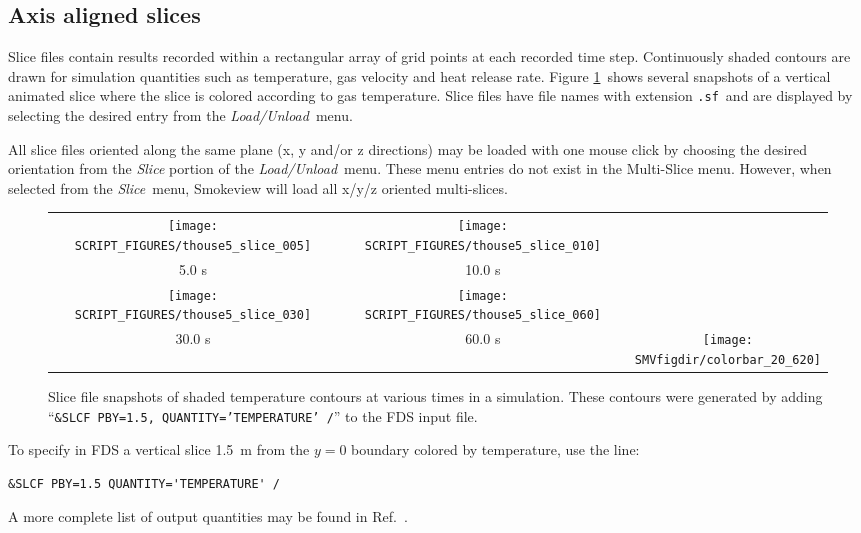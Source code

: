 \documentclass[11pt,twoside]{book}
\newcommand{\figheightAbar}{2.2in}
\begin{document}
\subsection{Axis aligned slices}

Slice files contain results recorded within a rectangular array of
grid points at each recorded time step. Continuously shaded
contours are drawn for simulation quantities such as temperature,
gas velocity and heat release rate. Figure \ref{figslice}\ shows
several snapshots of a vertical animated slice where the slice is
colored according to gas temperature. Slice files have file names
with extension {\tt .sf}\ and are displayed by selecting the
desired entry from the {\em Load/Unload}\ menu.

All slice files oriented along the same plane (x, y and/or z directions) may be loaded
with one mouse click by choosing the desired orientation from the {\em Slice}
portion of the {\em Load/Unload}\ menu.  These menu entries do not exist in the Multi-Slice menu.
However, when selected from the {\em Slice}\ menu, Smokeview will load all x/y/z oriented multi-slices.


\begin{figure}[bph]
\begin{center}
\begin{tabular}{ccc}
\texttt{[image: SCRIPT\_FIGURES/thouse5\_slice\_005]}&
\texttt{[image: SCRIPT\_FIGURES/thouse5\_slice\_010]}\\
5.0 s&10.0 s\\
\texttt{[image: SCRIPT\_FIGURES/thouse5\_slice\_030]}&
\texttt{[image: SCRIPT\_FIGURES/thouse5\_slice\_060]}&\\
30.0 s&60.0 s
&\raisebox{0.0ex}[0pt]{\texttt{[image: \\SMVfigdir/colorbar\_20\_620]}}\\
\end{tabular}
\caption [Slice file snapshots of shaded temperature contours.]
{Slice file snapshots of shaded temperature contours at various
times in a simulation. These contours were generated by adding
``{\tt \&SLCF PBY=1.5, QUANTITY='TEMPERATURE' /}'' to the FDS
input file. }
\label{figslice}%
\end{center}
\end{figure}

\indent To specify in FDS a vertical slice 1.5~m from the $y=0$
boundary colored by temperature, use the line:
\begin{lstlisting}[basicstyle=\ttfamily]
&SLCF PBY=1.5 QUANTITY='TEMPERATURE' /
\end{lstlisting}
A more complete list of output quantities may be found in
Ref.~\cite{FDS_Users_Guide}.
\end{document}
